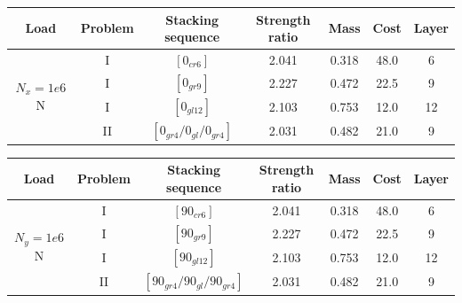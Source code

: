 \documentclass[smallextended]{svjour3}       %
\begin{document}
\begin{center}
\begin{tabular}{ccccccc}
	\toprule
	Load         &  Problem             & Stacking sequence        & Strength ratio  & Mass &  Cost   & Layer    \\
	\midrule
	  \multirow{4}{*}{$N_{x}=1e6$ N}  &    I      &  $[0_{cr6}]$                             & 2.041           & 0.318 &  48.0  & 6  \\
									  &     I     &  $[0_{gr9}]$                      & 2.227           & 0.472 &  22.5  & 9  \\
		         	                  &     I     &  $[0_{gl12}]$                             & 2.103           & 0.753 &  12.0  & 12  \\
									  &     II    &  $[0_{gr4}/0_{gl}/0_{gr4}]$                      & 2.031           & 0.482 &  21.0  & 9 \\
	\bottomrule
\end{tabular}

\end{center}

\begin{center}
\begin{tabular}{ccccccc}
	\toprule
	Load                             &Problem & Stacking sequence        & Strength ratio  & Mass &  Cost   & Layer    \\
	\midrule
	 \multirow{4}{*}{$N_{y}=1e6$ N}  &  I        &  $[90_{cr6}]$                             & 2.041           & 0.318 &  48.0  & 6  \\
					                 &  I        &  $[90_{gr9}]$                      & 2.227           & 0.472 &  22.5  & 9  \\
           		 	                 &  I        &  $[90_{gl12}]$                             & 2.103           & 0.753 &  12.0  & 12  \\
									 &  II       &  $[90_{gr4}/90_{gl}/90_{gr4}]$                      & 2.031           & 0.482 &  21.0  & 9 \\
	\bottomrule
\end{tabular}
\end{center}
\end{document}
